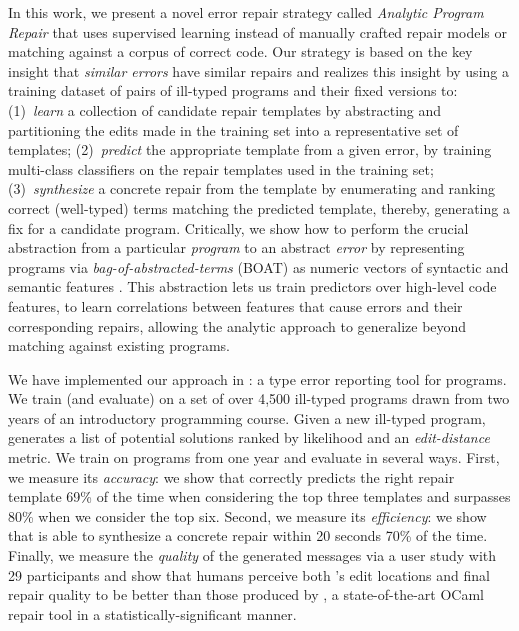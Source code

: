 %
In this work, we present a novel error repair strategy called \emph{Analytic
Program Repair} that uses supervised learning instead of manually crafted repair
models or matching against a corpus of correct code.
%
Our strategy is based on the key insight that \emph{similar errors} have similar
repairs and realizes this insight by using a training dataset of pairs of
ill-typed programs and their fixed versions to:
%
(1)~\emph{learn} a collection of candidate repair templates
    by abstracting and partitioning the edits made in the
    training set into a representative set of templates;
%
(2)~\emph{predict} the appropriate template from a given error,
    by training multi-class classifiers on the repair templates
    used in the training set;
%
(3)~\emph{synthesize} a concrete repair from the template
   by enumerating and ranking correct (\eg well-typed)
   terms matching the predicted template,
%
thereby, generating a fix for a candidate program.
%
Critically, we show how to perform the crucial abstraction
from a particular \emph{program} to an abstract \emph{error}
by representing programs via \emph{bag-of-abstracted-terms} (BOAT)
\ie as numeric vectors of syntactic and semantic features \citep{Seidel2017-ko}.
%
This abstraction lets us train predictors over high-level
code features, \ie to learn correlations between features
that cause errors and their corresponding repairs, allowing
the analytic approach to generalize beyond matching against
existing programs.

\mypara{\toolname}
%
We have implemented our approach in \toolname: a type error reporting
tool for \ocaml programs. We train (and evaluate) \toolname on a set of
over 4,500 ill-typed \ocaml programs drawn from two years of an
introductory programming course.
%
Given a new ill-typed program, \toolname generates a list of potential
solutions ranked by likelihood and an \emph{edit-distance} metric.
We train \toolname on programs from one year and evaluate in several
ways.
%
First, we measure its \emph{accuracy}: we show that \toolname correctly predicts
the right repair template 69\% of the time when considering the top three
templates and surpasses 80\% when we consider the top six.
%
Second, we measure its \emph{efficiency}: we show that \toolname is able to
synthesize a concrete repair within 20 seconds 70\% of the time.
%
Finally, we measure the \emph{quality} of the generated messages via a user
study with 29 participants and show that humans perceive both \toolname's edit
locations and final repair quality to be better than those produced by \seminal,
a state-of-the-art OCaml repair tool \citep{Lerner2007-dt} in a
statistically-significant manner.


